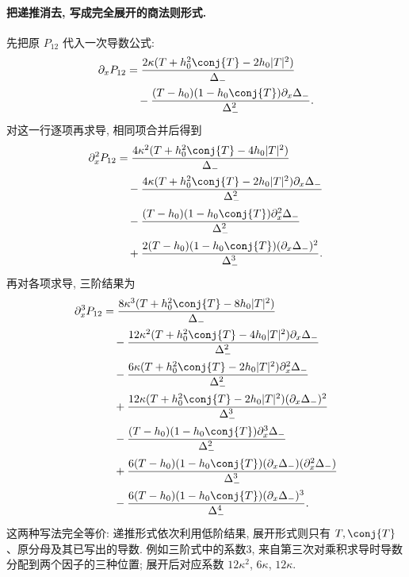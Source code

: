 \paragraph{把递推消去, 写成完全展开的商法则形式.}
先把原 $P_{12}$ 代入一次导数公式:
\begin{align*}
\partial_xP_{12}
&=\dfrac{2\kappa(T+h_0^2\conj{T}-2h_0|T|^2)}{\Delta_-}\\
&\quad-\dfrac{(T-h_0)(1-h_0\conj{T})\partial_x\Delta_-}{\Delta_-^2}.
\end{align*}
对这一行逐项再求导, 相同项合并后得到
\begin{align*}
\partial_x^2P_{12}
&=\dfrac{4\kappa^2(T+h_0^2\conj{T}-4h_0|T|^2)}{\Delta_-}\\
&\quad-\dfrac{4\kappa(T+h_0^2\conj{T}-2h_0|T|^2)
\partial_x\Delta_-}{\Delta_-^2}\\
&\quad-\dfrac{(T-h_0)(1-h_0\conj{T})
\partial_x^2\Delta_-}{\Delta_-^2}\\
&\quad+\dfrac{2(T-h_0)(1-h_0\conj{T})
(\partial_x\Delta_-)^2}{\Delta_-^3}.
\end{align*}
再对各项求导, 三阶结果为
\begin{align*}
\partial_x^3P_{12}
&=\dfrac{8\kappa^3(T+h_0^2\conj{T}-8h_0|T|^2)}{\Delta_-}\\
&\quad-\dfrac{12\kappa^2(T+h_0^2\conj{T}-4h_0|T|^2)
\partial_x\Delta_-}{\Delta_-^2}\\
&\quad-\dfrac{6\kappa(T+h_0^2\conj{T}-2h_0|T|^2)
\partial_x^2\Delta_-}{\Delta_-^2}\\
&\quad+\dfrac{12\kappa(T+h_0^2\conj{T}-2h_0|T|^2)
(\partial_x\Delta_-)^2}{\Delta_-^3}\\
&\quad-\dfrac{(T-h_0)(1-h_0\conj{T})
\partial_x^3\Delta_-}{\Delta_-^2}\\
&\quad+\dfrac{6(T-h_0)(1-h_0\conj{T})
(\partial_x\Delta_-)(\partial_x^2\Delta_-)}{\Delta_-^3}\\
&\quad-\dfrac{6(T-h_0)(1-h_0\conj{T})
(\partial_x\Delta_-)^3}{\Delta_-^4}.
\end{align*}
这两种写法完全等价: 递推形式依次利用低阶结果, 展开形式则只有 $T,\conj{T}$、原分母及其已写出的导数. 例如三阶式中的系数3, 来自第三次对乘积求导时导数分配到两个因子的三种位置; 展开后对应系数 $12\kappa^2$, $6\kappa$, $12\kappa$.

